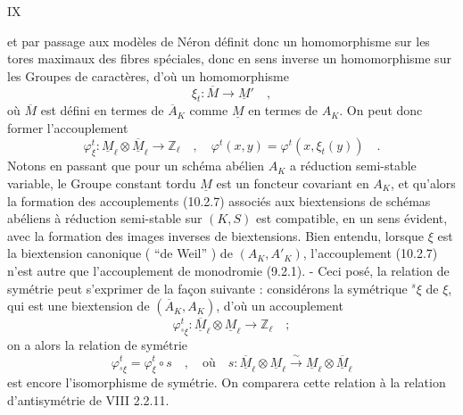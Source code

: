 \hfill IX

et par passage aux modèles de Néron définit donc un homomorphisme sur les tores maximaux des fibres spéciales, donc en sens inverse un homomorphisme sur les Groupes de caractères, d'où un homomorphisme
\[
 \xi_t:\overline M\longrightarrow\underline M'\quad,\tag*{(10.2.6)}
\]
où $\overline M$ est défini en termes de $\overline A_K$ comme $\underline M$ en termes de $A_K$. On peut donc former l'accouplement
\[
 \varphi^t_\xi:\underline M_\ell\otimes\underline{\overline M}_\ell\longrightarrow\mathbb Z_\ell
 \quad,\quad\varphi^t(x,y)=\varphi^t(x,\xi_t(y))\quad.\tag*{(10.2.7)}
\]
Notons en passant que pour un schéma abélien $A_K$ a réduction semi-stable variable, le Groupe constant tordu $\underline M$ est un foncteur covariant en $A_K$, et qu'alors la formation des accouplements (10.2.7) associés aux biextensions de schémas abéliens à réduction semi-stable sur $(K,S)$ est compatible, en un sens évident, avec la formation des images inverses de biextensions. Bien entendu, lorsque $\xi$ est la biextension canonique ( ``de Weil'' ) de $(A_K,A'_K)$, l'accouplement (10.2.7) n'est autre que l'accouplement de monodromie (9.2.1). - Ceci posé, la relation de symétrie peut s'exprimer de la façon suivante : considérons la symétrique $ {}^s\xi$ de $\xi$, qui est une biextension de $(\overline A_K,A_K)$, d'où un accouplement
\[
 \varphi^t_{{}^s\xi}:\underline{\overline M}_\ell\otimes\underline M_\ell\longrightarrow\mathbb Z_\ell\quad;
\]
on a alors la relation de symétrie
\[
 \varphi^t_{{}^s\xi}=\varphi^t_\xi\circ s\quad,\quad\text{où}\quad
 s:\underline{\overline M}_\ell\otimes\underline M_\ell\xrightarrow{\sim}\underline M_\ell\otimes\underline{\overline M}_\ell
 \tag*{(10.2.8)}
\]
est encore l'isomorphisme de symétrie. On comparera cette relation à la relation d'antisymétrie de VIII 2.2.11.

